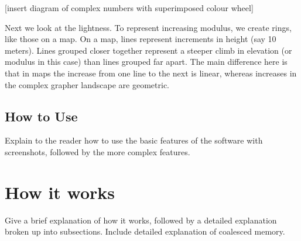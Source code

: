 \documentclass{article}
\begin{document}
		[insert diagram of complex numbers with superimposed colour wheel]
		
		Next we look at the lightness. To represent increasing modulus, we create rings, like those on a map. On a map, lines represent increments in height (say 10 meters).
		Lines grouped closer together represent a steeper climb in elevation (or modulus in this case) than lines grouped far apart. The main difference here is that in maps
		the increase from one line to the next is linear, whereas increases in the complex grapher landscape are geometric.
	
	\subsection{How to Use}
		Explain to the reader  how to use the basic features of the software with screenshots, followed by the more complex features.
		
	\section{How it works}
	Give a brief explanation of how it works, followed by a detailed explanation broken up into subsections. Include detailed explanation
	of coalesced memory.
   
\end{document}
